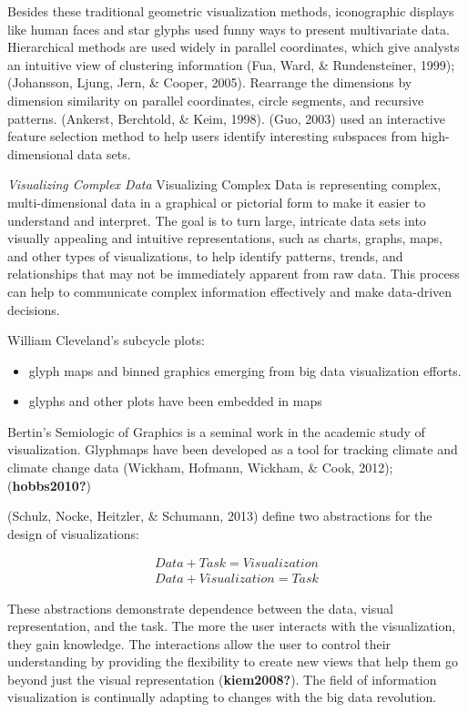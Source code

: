 \documentclass[print]{nuthesis}
\providecommand{\tightlist}{%
  \setlength{\itemsep}{0pt}\setlength{\parskip}{0pt}}
\begin{document}
Besides these traditional geometric visualization methods, iconographic displays like human faces and star glyphs used funny ways to present multivariate data. Hierarchical methods are used widely in parallel coordinates, which give analysts an intuitive view of clustering information (Fua, Ward, \& Rundensteiner, 1999); (Johansson, Ljung, Jern, \& Cooper, 2005). Rearrange the dimensions by dimension similarity on parallel coordinates, circle segments, and recursive patterns. (Ankerst, Berchtold, \& Keim, 1998). (Guo, 2003) used an interactive feature selection method to help users identify interesting subspaces from high-dimensional data sets.

\emph{Visualizing Complex Data}
Visualizing Complex Data is representing complex, multi-dimensional data in a graphical or pictorial form to make it easier to understand and interpret. The goal is to turn large, intricate data sets into visually appealing and intuitive representations, such as charts, graphs, maps, and other types of visualizations, to help identify patterns, trends, and relationships that may not be immediately apparent from raw data. This process can help to communicate complex information effectively and make data-driven decisions.

William Cleveland's subcycle plots:

\begin{itemize}
\tightlist
\item
  glyph maps and binned graphics emerging from big data visualization efforts.
\item
  glyphs and other plots have been embedded in maps
\end{itemize}

Bertin's Semiologic of Graphics is a seminal work in the academic study of visualization. Glyphmaps have been developed as a tool for tracking climate and climate change data (Wickham, Hofmann, Wickham, \& Cook, 2012); (\textbf{hobbs2010?})

(Schulz, Nocke, Heitzler, \& Schumann, 2013) define two abstractions for the design of visualizations:

\begin{center}
\begin{align*}
  Data + Task = Visualization \\
  Data + Visualization = Task
\end{align*}
\end{center}

These abstractions demonstrate dependence between the data, visual representation, and the task. The more the user interacts with the visualization, they gain knowledge. The interactions allow the user to control their understanding by providing the flexibility to create new views that help them go beyond just the visual representation (\textbf{kiem2008?}). The field of information visualization is continually adapting to changes with the big data revolution.
\end{document}
